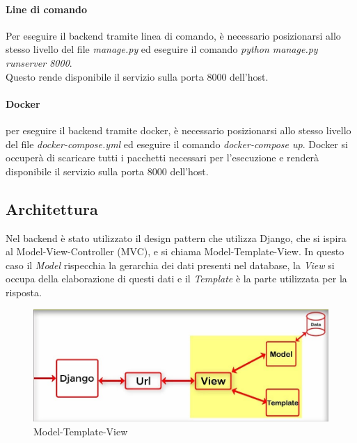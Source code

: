 \paragraph{Line di comando}
Per eseguire il backend tramite linea di comando, è necessario posizionarsi allo stesso livello del file \textit{manage.py} ed eseguire il comando \textit{python manage.py runserver 8000}.\\Questo rende disponibile il servizio sulla porta 8000 dell'host.
\paragraph{Docker}
per eseguire il backend tramite docker, è necessario posizionarsi allo stesso livello del file \textit{docker-compose.yml} ed eseguire il comando \textit{docker-compose up}. Docker si occuperà di scaricare tutti i pacchetti necessari per l'esecuzione e renderà disponibile il servizio sulla porta 8000 dell'host.
\subsection{Architettura}
Nel backend è stato utilizzato il design pattern che utilizza Django, che si ispira al Model-View-Controller (MVC), e si chiama Model-Template-View.
In questo caso il \textit{Model} rispecchia la gerarchia dei dati presenti nel database, la \textit{View} si occupa della elaborazione di questi dati e il \textit{Template} è la parte utilizzata per la risposta.
\begin{figure}[H]
	\centering
	\includegraphics[width=16cm]{res/images/mvt.png}
	\caption{Model-Template-View}
	\label{fig:Model-Template-View}
\end{figure}